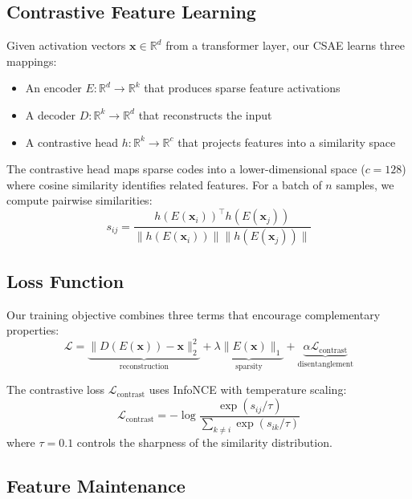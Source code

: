 \documentclass{article} %
\begin{document}
\subsection{Contrastive Feature Learning}

Given activation vectors $\mathbf{x} \in \mathbb{R}^d$ from a transformer layer, our CSAE learns three mappings:
\begin{itemize}
    \item An encoder $E: \mathbb{R}^d \rightarrow \mathbb{R}^k$ that produces sparse feature activations
    \item A decoder $D: \mathbb{R}^k \rightarrow \mathbb{R}^d$ that reconstructs the input
    \item A contrastive head $h: \mathbb{R}^k \rightarrow \mathbb{R}^c$ that projects features into a similarity space
\end{itemize}

The contrastive head maps sparse codes into a lower-dimensional space ($c=128$) where cosine similarity identifies related features. For a batch of $n$ samples, we compute pairwise similarities:
\begin{equation}
s_{ij} = \frac{h(E(\mathbf{x}_i))^\top h(E(\mathbf{x}_j))}{\|h(E(\mathbf{x}_i))\| \|h(E(\mathbf{x}_j))\|}
\end{equation}

\subsection{Loss Function}

Our training objective combines three terms that encourage complementary properties:
\begin{equation}
\mathcal{L} = \underbrace{\|D(E(\mathbf{x})) - \mathbf{x}\|_2^2}_{\text{reconstruction}} + \underbrace{\lambda\|E(\mathbf{x})\|_1}_{\text{sparsity}} + \underbrace{\alpha\mathcal{L}_{\text{contrast}}}_{\text{disentanglement}}
\end{equation}

The contrastive loss $\mathcal{L}_{\text{contrast}}$ uses InfoNCE with temperature scaling:
\begin{equation}
\mathcal{L}_{\text{contrast}} = -\log\frac{\exp(s_{ij}/\tau)}{\sum_{k\neq i}\exp(s_{ik}/\tau)}
\end{equation}
where $\tau=0.1$ controls the sharpness of the similarity distribution.

\subsection{Feature Maintenance}
\end{document}
